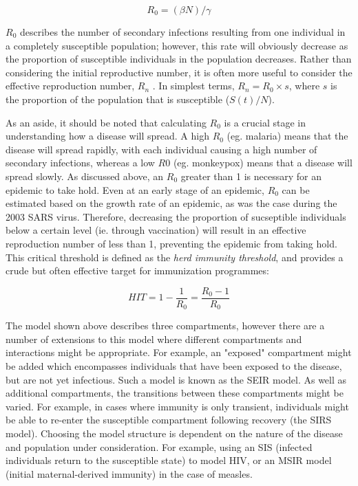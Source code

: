 \documentclass[11pt, a4paper, oneside,titlepage]{article}
\begin{document}
\begin{equation*}
R_0 = (\beta N)/\gamma
\end{equation*}

$R_0$ describes the number of secondary infections resulting from one individual in a completely susceptible population; however, this rate will obviously decrease as the proportion of susceptible individuals in the population decreases. Rather than considering the initial reproductive number, it is often more useful to consider the effective reproduction number, $R_n$ . In simplest terms, $R_n = R_0 \times s$, where $s$ is the proportion of the population that is susceptible ($S(t)/N$).

As an aside, it should be noted that calculating $R_0$ is a crucial stage in understanding how a disease will spread. A high $R_0$ (eg. malaria) means that the disease will spread rapidly, with each individual causing a high number of secondary infections, whereas a low $R0$ (eg. monkeypox) means that a disease will spread slowly.\cite{vynnycky} As discussed above, an $R_0$ greater than 1 is necessary for an epidemic to take hold. Even at an early stage of an epidemic, $R_0$ can be estimated based on the growth rate of an epidemic, as was the case during the 2003 SARS virus.\cite{sars} Therefore, decreasing the proportion of sucseptible individuals below a certain level (ie. through vaccination) will result in an effective reproduction number of less than 1, preventing the epidemic from taking hold. This critical threshold is defined as the \emph{herd immunity threshold}, and provides a crude but often effective target for immunization programmes:\cite{cockman}

\begin{equation*}
HIT = 1 - \frac{1}{R_0} = \frac{R_0 -1}{R_0}
\end{equation*}

The model shown above describes three compartments, however there are a number of extensions to this model where different compartments and interactions might be appropriate. For example, an "exposed" compartment might be added which encompasses individuals that have been exposed to the disease, but are not yet infectious. Such a model is known as the SEIR model. As well as additional compartments, the transitions between these compartments might be varied. For example, in cases where immunity is only transient, individuals might be able to re-enter the susceptible compartment following recovery (the SIRS model). Choosing the model structure is dependent on the nature of the disease and population under consideration. For example, using an SIS (infected individuals return to the susceptible state) to model HIV, or an MSIR model (initial maternal-derived immunity) in the case of measles.\cite{vynnycky} 
\end{document}
